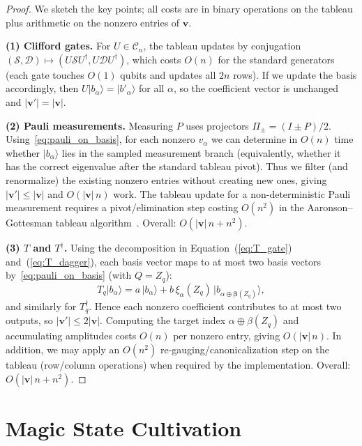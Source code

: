 \documentclass[10pt,conference]{IEEEtran}
\begin{document}
\begin{proof}
We sketch the key points; all costs are in binary operations on the tableau plus arithmetic on the nonzero entries of $\mathbf{v}$.

\textbf{(1) Clifford gates.}
For $U\in\mathcal{C}_n$, the tableau updates by conjugation
$(\mathcal{S},\mathcal{D})\mapsto(U\mathcal{S}U^\dagger,U\mathcal{D}U^\dagger)$,
which costs $O(n)$ for the standard generators (each gate touches $O(1)$ qubits and updates all $2n$ rows).
If we update the basis accordingly, then $U|b_\alpha\rangle=|b'_\alpha\rangle$ for all $\alpha$, so the coefficient vector is unchanged and $|\mathbf{v}'|=|\mathbf{v}|$.

\textbf{(2) Pauli measurements.}
Measuring $P$ uses projectors $\Pi_{\pm}=(I\pm P)/2$.
Using~\eqref{eq:pauli_on_basis}, for each nonzero $v_\alpha$ we can determine in $O(n)$ time whether $|b_\alpha\rangle$ lies in the sampled measurement branch (equivalently, whether it has the correct eigenvalue after the standard tableau pivot). 
Thus we filter (and renormalize) the existing nonzero entries without creating new ones, giving $|\mathbf{v}'|\le|\mathbf{v}|$ and $O(|\mathbf{v}|\,n)$ work.
The tableau update for a non-deterministic Pauli measurement requires a pivot/elimination step costing $O(n^2)$ in the Aaronson--Gottesman tableau algorithm~\cite{aaronson2004improved}.
Overall: $O(|\mathbf{v}|\,n+n^2)$.

\textbf{(3) $T$ and $T^\dagger$.}
Using the decomposition in Equation~(\ref{eq:T_gate}) and~(\ref{eq:T_dagger}), each basis vector maps to at most two basis vectors by~\eqref{eq:pauli_on_basis} (with $Q=Z_q$):
\[
T_q|b_\alpha\rangle = a\,|b_\alpha\rangle + b\,\xi_{\alpha}(Z_q)\,|b_{\alpha\oplus\mathbf{\beta}(Z_q)}\rangle,
\]
and similarly for $T_q^\dagger$.
Hence each nonzero coefficient contributes to at most two outputs, so $|\mathbf{v}'|\le 2|\mathbf{v}|$.
Computing the target index $\alpha\oplus\beta(Z_q)$ and accumulating amplitudes costs $O(n)$ per nonzero entry, giving $O(|\mathbf{v}|\,n)$.
In addition, we may apply an $O(n^2)$ re-gauging/canonicalization step on the tableau (row/column operations) when required by the implementation.
Overall: $O(|\mathbf{v}|\,n+n^2)$.
\end{proof}

\section{Magic State Cultivation}
\end{document}
